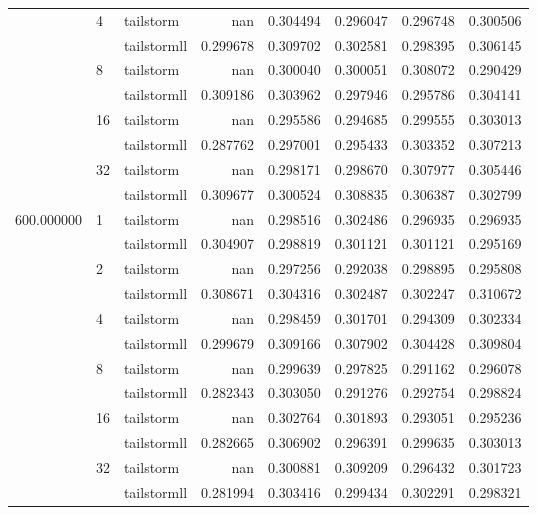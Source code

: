 \begin{tabular}{lllrrrrr}
 & \multirow[c]{2}{*}{4} & tailstorm & nan & 0.304494 & 0.296047 & 0.296748 & 0.300506 \\
 &  & tailstormll & 0.299678 & 0.309702 & 0.302581 & 0.298395 & 0.306145 \\
 & \multirow[c]{2}{*}{8} & tailstorm & nan & 0.300040 & 0.300051 & 0.308072 & 0.290429 \\
 &  & tailstormll & 0.309186 & 0.303962 & 0.297946 & 0.295786 & 0.304141 \\
 & \multirow[c]{2}{*}{16} & tailstorm & nan & 0.295586 & 0.294685 & 0.299555 & 0.303013 \\
 &  & tailstormll & 0.287762 & 0.297001 & 0.295433 & 0.303352 & 0.307213 \\
 & \multirow[c]{2}{*}{32} & tailstorm & nan & 0.298171 & 0.298670 & 0.307977 & 0.305446 \\
 &  & tailstormll & 0.309677 & 0.300524 & 0.308835 & 0.306387 & 0.302799 \\
\multirow[c]{12}{*}{600.000000} & \multirow[c]{2}{*}{1} & tailstorm & nan & 0.298516 & 0.302486 & 0.296935 & 0.296935 \\
 &  & tailstormll & 0.304907 & 0.298819 & 0.301121 & 0.301121 & 0.295169 \\
 & \multirow[c]{2}{*}{2} & tailstorm & nan & 0.297256 & 0.292038 & 0.298895 & 0.295808 \\
 &  & tailstormll & 0.308671 & 0.304316 & 0.302487 & 0.302247 & 0.310672 \\
 & \multirow[c]{2}{*}{4} & tailstorm & nan & 0.298459 & 0.301701 & 0.294309 & 0.302334 \\
 &  & tailstormll & 0.299679 & 0.309166 & 0.307902 & 0.304428 & 0.309804 \\
 & \multirow[c]{2}{*}{8} & tailstorm & nan & 0.299639 & 0.297825 & 0.291162 & 0.296078 \\
 &  & tailstormll & 0.282343 & 0.303050 & 0.291276 & 0.292754 & 0.298824 \\
 & \multirow[c]{2}{*}{16} & tailstorm & nan & 0.302764 & 0.301893 & 0.293051 & 0.295236 \\
 &  & tailstormll & 0.282665 & 0.306902 & 0.296391 & 0.299635 & 0.303013 \\
 & \multirow[c]{2}{*}{32} & tailstorm & nan & 0.300881 & 0.309209 & 0.296432 & 0.301723 \\
 &  & tailstormll & 0.281994 & 0.303416 & 0.299434 & 0.302291 & 0.298321 \\
\end{tabular}
